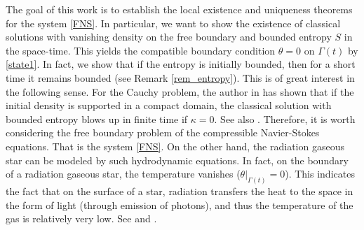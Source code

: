 \documentclass[12pt,a4paper]{amsart}
\numberwithin{equation}{section}
\theoremstyle{plain}
\theoremstyle{definition}
\begin{document}
The goal of this work is to establish the local existence and uniqueness theorems for the system \eqref{FNS}. In particular, we want to show the existence of classical solutions with vanishing density on the free boundary and bounded entropy $S$ in the space-time. 
This yields the compatible boundary condition $\theta = 0 $ on $ \Gamma(t) $ by \eqref{state1}.
In fact, we show that if the entropy is initially bounded, then for a short time it remains bounded (see Remark \ref{rem_entropy}). 
This is of great interest in the following sense. For the Cauchy problem, the author in \cite{Xin1998} has shown that if the initial density is supported in a compact domain, the classical solution with bounded entropy blows up in finite time if $ \kappa = 0 $. See also \cite{Xin2013}. Therefore, it is worth considering the free boundary problem of the compressible Navier-Stokes equations.
That is the system \eqref{FNS}. 
On the other hand, the radiation gaseous star can be modeled by such hydrodynamic equations. In fact, on the boundary of a radiation gaseous star, the temperature vanishes ($ \theta|_{\Gamma(t)} = 0 $). This indicates the fact that on the surface of a star, radiation transfers the heat to the space in the form of light (through emission of photons), and thus the temperature of the gas is relatively very low. See \cite{Chandrasekhar1957} and \cite{Liu2016a}. 
\end{document}
